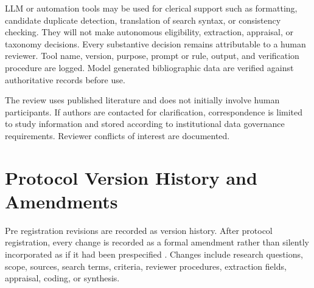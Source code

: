 LLM or automation tools may be used for clerical support such as formatting, candidate duplicate detection, translation of search syntax, or consistency checking. They will not make autonomous eligibility, extraction, appraisal, or taxonomy decisions. Every substantive decision remains attributable to a human reviewer. Tool name, version, purpose, prompt or rule, output, and verification procedure are logged. Model generated bibliographic data are verified against authoritative records before use.

The review uses published literature and does not initially involve human participants. If authors are contacted for clarification, correspondence is limited to study information and stored according to institutional data governance requirements. Reviewer conflicts of interest are documented.

\section{Protocol Version History and Amendments}
\label{sec:protocol_amendments}

Pre registration revisions are recorded as version history. After protocol registration, every change is recorded as a formal amendment rather than silently incorporated as if it had been prespecified \cite{Shamseer2015PRISMAP}. Changes include research questions, scope, sources, search terms, criteria, reviewer procedures, extraction fields, appraisal, coding, or synthesis.

